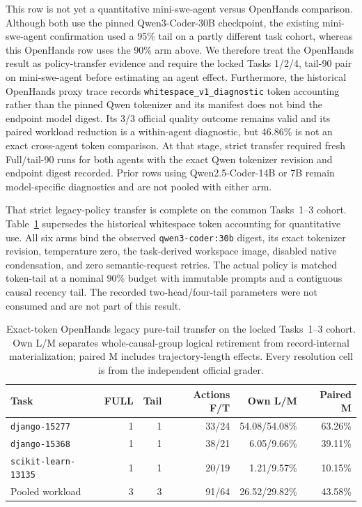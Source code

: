 \documentclass[11pt]{article}
\begin{document}
This row is not yet a quantitative mini-swe-agent versus OpenHands comparison.
Although both use the pinned Qwen3-Coder-30B checkpoint, the existing
mini-swe-agent confirmation used a 95\% tail on a partly different task cohort,
whereas this OpenHands row uses the 90\% arm above.  We therefore treat the
OpenHands result as policy-transfer evidence and require the locked Tasks
1/2/4, tail-90 pair on mini-swe-agent before estimating an agent effect.
Furthermore, the historical OpenHands proxy trace records
\texttt{whitespace\_v1\_diagnostic} token accounting rather than the pinned
Qwen tokenizer and its manifest does not bind the endpoint model digest.  Its
3/3 official quality outcome remains valid and its paired workload reduction
is a within-agent diagnostic, but 46.86\% is not an exact cross-agent token
comparison.  At that stage, strict transfer required fresh Full/tail-90 runs for both agents
with the exact Qwen tokenizer revision and endpoint digest recorded.  Prior
rows using Qwen2.5-Coder-14B or 7B remain model-specific diagnostics and are
not pooled with either arm.

That strict legacy-policy transfer is complete on the common Tasks~1--3 cohort.
Table~\ref{tab:openhands-exact-tail90} supersedes the historical whitespace
token accounting for quantitative use.  All six arms bind the observed
\texttt{qwen3-coder:30b} digest, its exact tokenizer revision, temperature
zero, the task-derived workspace image, disabled native condensation, and
zero semantic-request retries.  The actual policy is matched token-tail at a
nominal 90\% budget with immutable prompts and a contiguous causal recency
tail.  The recorded two-head/four-tail parameters were not consumed and are
not part of this result.

\begin{table}[H]
\centering
\scriptsize
\caption{Exact-token OpenHands legacy pure-tail transfer on the locked
Tasks~1--3 cohort.
Own L/M separates whole-causal-group logical retirement from record-internal
materialization; paired M includes trajectory-length effects.
Every resolution cell is from the independent official grader.}
\label{tab:openhands-exact-tail90}
\begin{tabular}{lrrrrr}
\toprule
Task & FULL & Tail & Actions F/T & Own L/M & Paired M \\
\midrule
\texttt{django-15277} & 1 & 1 & 33/24 & 54.08/54.08\% & 63.26\% \\
\texttt{django-15368} & 1 & 1 & 38/21 & 6.05/9.66\% & 39.11\% \\
\texttt{scikit-learn-13135} & 1 & 1 & 20/19 & 1.21/9.57\% & 10.15\% \\
\midrule
Pooled workload & 3 & 3 & 91/64 & 26.52/29.82\% & 43.58\% \\
\bottomrule
\end{tabular}
\end{table}
\end{document}
